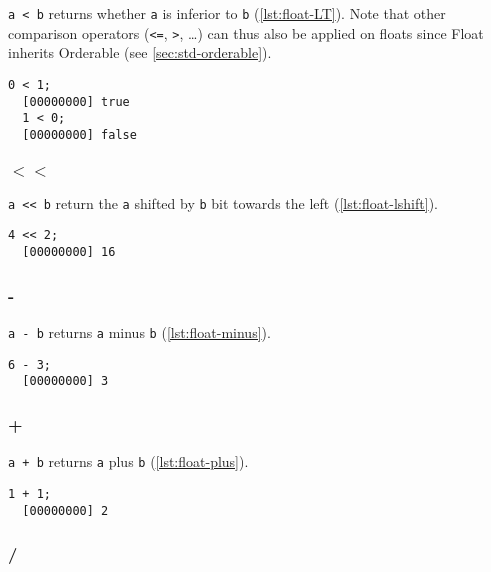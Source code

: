 \lstinline|a < b| returns whether \lstinline|a| is inferior to
\lstinline|b| (\autoref{lst:float-LT}). Note that other comparison operators
(\lstinline|<=|, \lstinline|>|, \ldots) can thus also be applied on
floats since Float inherits Orderable (see \autoref{sec:std-orderable}).

\begin{lstlisting}[caption=Float.'$<$', label=lst:float-LT,
  float=\floatposh]
  0 < 1;
  [00000000] true
  1 < 0;
  [00000000] false
\end{lstlisting}

\subsubsection{$<<$}

\lstinline|a << b| return the \lstinline|a| shifted by \lstinline|b|
bit towards the left (\autoref{lst:float-lshift}).

\begin{lstlisting}[caption=Float.'$<<$', label=lst:float-lshift,
  float=\floatposh]
  4 << 2;
  [00000000] 16
\end{lstlisting}

\subsubsection{-}

\lstinline|a - b| returns \lstinline|a| minus \lstinline|b| (\autoref{lst:float-minus}).

\begin{lstlisting}[caption=Float.'-', label=lst:float-minus,
  float=\floatposh]
  6 - 3;
  [00000000] 3
\end{lstlisting}

\subsubsection{+}

\lstinline|a + b| returns \lstinline|a| plus \lstinline|b| (\autoref{lst:float-plus}).

\begin{lstlisting}[caption=Float.'+', label=lst:float-plus, float=\floatposh]
  1 + 1;
  [00000000] 2
\end{lstlisting}

\subsubsection{/}

